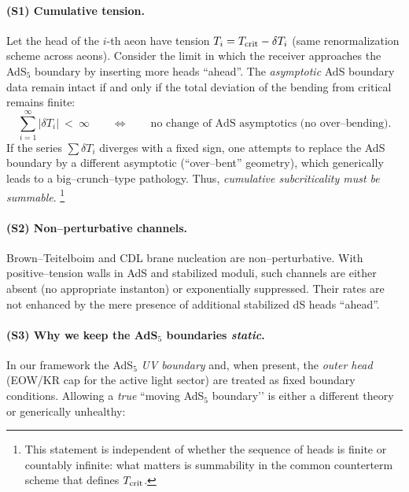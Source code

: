 \documentclass[10pt]{article}
\theoremstyle{definition}
\theoremstyle{plain}
\begin{document}
\paragraph{(S1) Cumulative tension.}\label{par:uom-main-109}
Let the head of the \(i\)-th aeon have tension \(T_i=T_{\rm crit}-\delta T_i\) (same renormalization scheme across aeons). 
Consider the limit in which the receiver approaches the AdS$_5$ boundary by inserting more heads ``ahead''. 
The \emph{asymptotic} AdS boundary data remain intact if and only if the total deviation of the bending from critical remains finite:
\begin{equation}
\sum_{i=1}^{\infty} |\delta T_i|\ <\ \infty\qquad\Longleftrightarrow\qquad
\text{no change of AdS asymptotics (no over–bending)}.
\label{eq:cum-tension}
\end{equation}
If the series \(\sum \delta T_i\) diverges with a fixed sign, one attempts to replace the AdS boundary by a different asymptotic (``over–bent'' geometry), which generically leads to a big–crunch–type pathology.
Thus, \emph{cumulative subcriticality must be summable}.%
\footnote{This statement is independent of whether the sequence of heads is finite or countably infinite: what matters is summability in the common counterterm scheme that defines \(T_{\rm crit}\).}

\paragraph{(S2) Non–perturbative channels.}\label{par:uom-main-110}
Brown–Teitelboim and CDL brane nucleation are non–perturbative. With positive–tension walls in AdS and stabilized moduli, such channels are either absent (no appropriate instanton) or exponentially suppressed. Their rates are not enhanced by the mere presence of additional stabilized dS heads ``ahead''.

\paragraph{(S3) Why we keep the AdS$_5$ boundaries \emph{static}.}\label{par:uom-main-111}
In our framework the AdS$_5$ \emph{UV boundary} and, when present, the \emph{outer head} (EOW/KR cap for the active light sector) are treated as fixed boundary conditions. Allowing a \emph{true} “moving AdS$_5$ boundary’’ is either a different theory or generically unhealthy:
\end{document}
